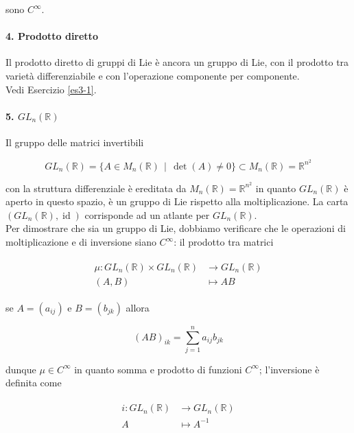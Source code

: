 sono $ C^{\infty} $.

\paragraph{4. Prodotto diretto}

Il prodotto diretto di gruppi di Lie è ancora un gruppo di Lie, con il prodotto tra varietà differenziabile e con l'operazione componente per componente.\\
Vedi Esercizio \ref{es3-1}.

\paragraph{5. $ GL_{n}(\mathbb{R}) $}

Il gruppo delle matrici invertibili

\begin{equation}
	GL_{n}(\mathbb{R}) = \{ A \in M_{n}(\mathbb{R}) \, \mid \, \det(A) \neq 0 \} \subset M_{n}(\mathbb{R}) = \mathbb{R}^{n^{2}}
\end{equation}

con la struttura differenziale è ereditata da $ M_{n}(\mathbb{R}) = \mathbb{R}^{n^{2}} $ in quanto $ GL_{n}(\mathbb{R}) $ è aperto in questo spazio, è un gruppo di Lie rispetto alla moltiplicazione. La carta $ (GL_{n}(\mathbb{R}),\operatorname{id}) $ corrisponde ad un atlante per $ GL_{n}(\mathbb{R}) $.\\
Per dimostrare che sia un gruppo di Lie, dobbiamo verificare che le operazioni di moltiplicazione e di inversione siano $ C^{\infty} $: il prodotto tra matrici

\begin{align}
	\begin{split}
		\mu : GL_{n}(\mathbb{R}) \times GL_{n}(\mathbb{R}) &\to GL_{n}(\mathbb{R})\\
		(A,B) &\mapsto A B
	\end{split}
\end{align}

se $ A = (a_{ij}) $ e $ B = (b_{jk}) $ allora

\begin{equation}
	(A B)_{ik} = \sum_{j=1}^{n} a_{ij} b_{jk}
\end{equation}

dunque $ \mu \in C^{\infty} $ in quanto somma e prodotto di funzioni $ C^{\infty} $; l'inversione è definita come

\begin{align}
	\begin{split}
		i : GL_{n}(\mathbb{R}) &\to GL_{n}(\mathbb{R})\\
		A &\mapsto A^{-1}
	\end{split}
\end{align}

